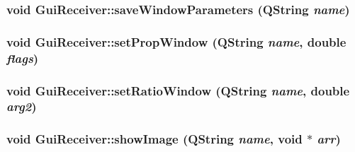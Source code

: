 \label{classGuiReceiver_a42b8802376fe8f63922969475875eea6}
\hypertarget{classGuiReceiver_a0b4cb6c25ca109fdbcdc0538caf91da5}{
\subsubsection[{saveWindowParameters}]{\setlength{\rightskip}{0pt plus 5cm}void GuiReceiver::saveWindowParameters (QString {\em name})}}
\label{classGuiReceiver_a0b4cb6c25ca109fdbcdc0538caf91da5}
\hypertarget{classGuiReceiver_a2f7df93bb22ec310b8f9b44844662b85}{
\subsubsection[{setPropWindow}]{\setlength{\rightskip}{0pt plus 5cm}void GuiReceiver::setPropWindow (QString {\em name}, \/  double {\em flags})}}
\label{classGuiReceiver_a2f7df93bb22ec310b8f9b44844662b85}
\hypertarget{classGuiReceiver_a42057f63804bb4f378c9ecb9a77f140c}{
\subsubsection[{setRatioWindow}]{\setlength{\rightskip}{0pt plus 5cm}void GuiReceiver::setRatioWindow (QString {\em name}, \/  double {\em arg2})}}
\label{classGuiReceiver_a42057f63804bb4f378c9ecb9a77f140c}
\hypertarget{classGuiReceiver_a185d6468377d45e2a2589bbb64a9ec62}{
\subsubsection[{showImage}]{\setlength{\rightskip}{0pt plus 5cm}void GuiReceiver::showImage (QString {\em name}, \/  void $\ast$ {\em arr})}}
\label{classGuiReceiver_a185d6468377d45e2a2589bbb64a9ec62}
